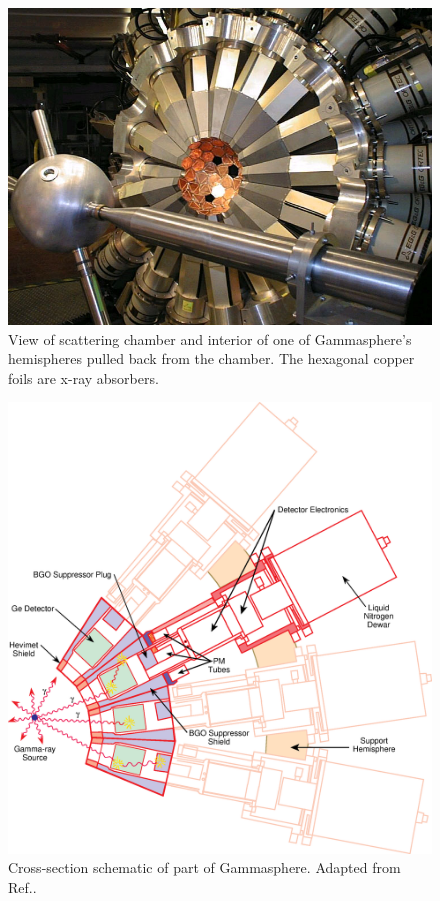 \begin{figure}[ht!]
	\centerline{\includegraphics[height=0.3\textheight]{./img/c3/gammasphere_hemi.jpg}}
	\caption{View of scattering chamber and interior of one of Gammasphere's hemispheres pulled back from the chamber. The hexagonal copper foils are x-ray absorbers.\label{fig:chp3-gs-hemisphere}}
\end{figure}


\begin{figure}[h]
	\centerline{\includegraphics[height=0.5\textheight]{./img/c3/gammasphere_detector.eps}}
	\caption{Cross-section schematic of part of Gammasphere. Adapted from Ref.\cite{gsBooklet}.\label{fig:chp3-gs_det_schem}}
\end{figure}

